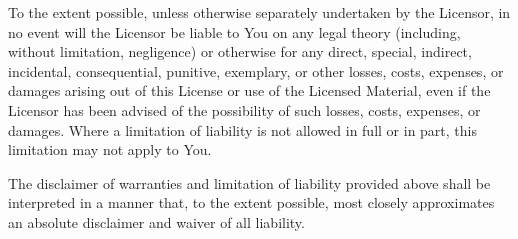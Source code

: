 \documentclass{article}
\begin{document}
\begin{sffamily}
To the extent possible, unless otherwise separately undertaken by the Licensor, in no event will the Licensor be liable to You on any legal theory (including, without limitation, negligence) or otherwise for any direct, special, indirect, incidental, consequential, punitive, exemplary, or other losses, costs, expenses, or damages arising out of this License or use of the Licensed Material, even if the Licensor has been advised of the possibility of such losses, costs, expenses, or damages. Where a limitation of liability is not allowed in full or in part, this limitation may not apply to You.

The disclaimer of warranties and limitation of liability provided above shall be interpreted in a manner that, to the extent possible, most closely approximates an absolute disclaimer and waiver of all liability.

\end{sffamily}
\end{document}
